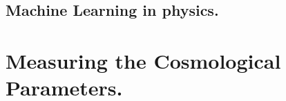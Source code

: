 \documentclass{beamer}
\begin{document}
\subsection{Machine Learning in physics.}
%
%
\section{Measuring the Cosmological Parameters.}
\frame{
\tableofcontents[ 
    currentsection, 
    sectionstyle=show/hide, 
    sectionstyle=show/shaded, 
    ] 
}
\end{document}
